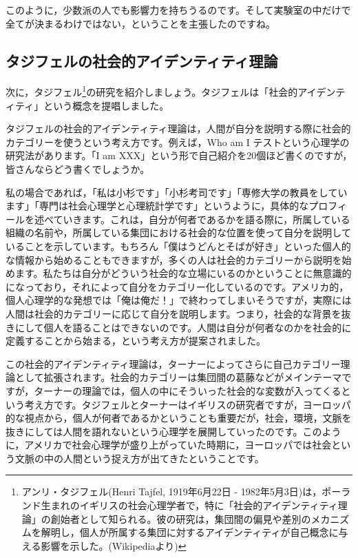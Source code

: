\documentclass{ltjsbook}
\begin{document}
このように，少数派の人でも影響力を持ちうるのです。そして実験室の中だけで全てが決まるわけではない，ということを主張したのですね。

\subsection{タジフェルの社会的アイデンティティ理論}
次に，タジフェル\footnote{アンリ・タジフェル(Henri Tajfel, 1919年6月22日 - 1982年5月3日)は，ポーランド生まれのイギリスの社会心理学者で，特に「社会的アイデンティティ理論」の創始者として知られる。彼の研究は，集団間の偏見や差別のメカニズムを解明し，個人が所属する集団に対するアイデンティティが自己概念に与える影響を示した。(Wikipediaより)}の研究を紹介しましょう。タジフェルは「社会的アイデンティティ」という概念を提唱しました。

タジフェルの社会的アイデンティティ理論は，人間が自分を説明する際に社会的カテゴリーを使うという考え方です。例えば，Who am I テストという心理学の研究法があります。「I am XXX」という形で自己紹介を20個ほど書くのですが，皆さんならどう書くでしょうか。

私の場合であれば，「私は小杉です」「小杉考司です」「専修大学の教員をしています」「専門は社会心理学と心理統計学です」というように，具体的なプロフィールを述べていきます。これは，自分が何者であるかを語る際に，所属している組織の名前や，所属している集団における社会的な位置を使って自分を説明していることを示しています。もちろん「僕はうどんとそばが好き」といった個人的な情報から始めることもできますが，多くの人は社会的カテゴリーから説明を始めます。私たちは自分がどういう社会的な立場にいるのかということに無意識的になっており，それによって自分をカテゴリー化しているのです。アメリカ的，個人心理学的な発想では「俺は俺だ！」で終わってしまいそうですが，実際には人間は社会的カテゴリーに応じて自分を説明します。つまり，社会的な背景を抜きにして個人を語ることはできないのです。人間は自分が何者なのかを社会的に定義することから始まる，という考え方が提案されました。

この社会的アイデンティティ理論は，ターナーによってさらに自己カテゴリー理論として拡張されます。社会的カテゴリーは集団間の葛藤などがメインテーマですが，ターナーの理論では，個人の中にそういった社会的な変数が入ってくるという考え方です。タジフェルとターナーはイギリスの研究者ですが，ヨーロッパ的な視点から，個人が何者であるかということも重要だが，社会，環境，文脈を抜きにしては人間を語れないという心理学を展開していったのです。このように，アメリカで社会心理学が盛り上がっていた時期に，ヨーロッパでは社会という文脈の中の人間という捉え方が出てきたということです。
\end{document}
